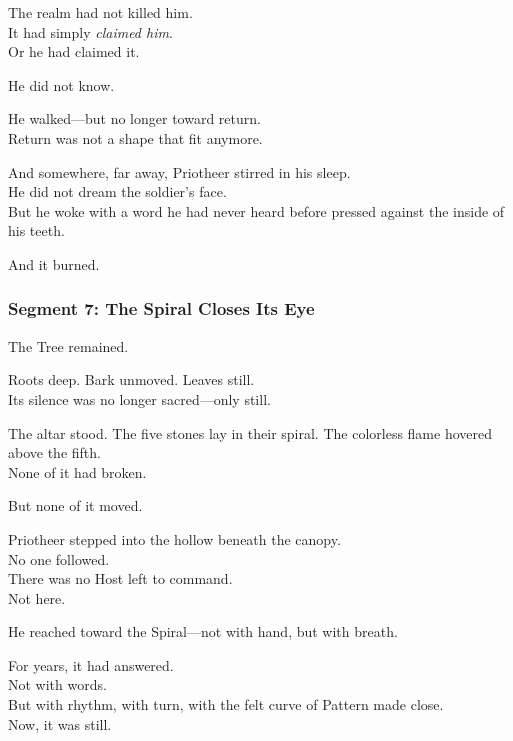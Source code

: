 \documentclass[9pt]{article}
\begin{document}
\vspace{0.5em}
The realm had not killed him.\\
It had simply \textit{claimed him}.\\
Or he had claimed it.

\vspace{0.5em}
He did not know.

\vspace{0.5em}
He walked---but no longer toward return.\\
Return was not a shape that fit anymore.

\vspace{0.5em}
And somewhere, far away, Priotheer stirred in his sleep.\\
He did not dream the soldier’s face.\\
But he woke with a word he had never heard before pressed against the inside of his teeth.

\vspace{0.5em}
And it burned.

\newpage

\subsubsection*{Segment 7: The Spiral Closes Its Eye}

The Tree remained.

\vspace{0.5em}
Roots deep. Bark unmoved. Leaves still.\\
Its silence was no longer sacred---only still.

\vspace{0.5em}
The altar stood. The five stones lay in their spiral. The colorless flame hovered above the fifth.\\
None of it had broken.

\vspace{0.5em}
But none of it moved.

\vspace{0.5em}
Priotheer stepped into the hollow beneath the canopy.\\
No one followed.\\
There was no Host left to command.\\
Not here.

\vspace{0.5em}
He reached toward the Spiral---not with hand, but with breath.

\vspace{0.5em}
For years, it had answered.\\
Not with words.\\
But with rhythm, with turn, with the felt curve of Pattern made close.\\
Now, it was still.
\end{document}

